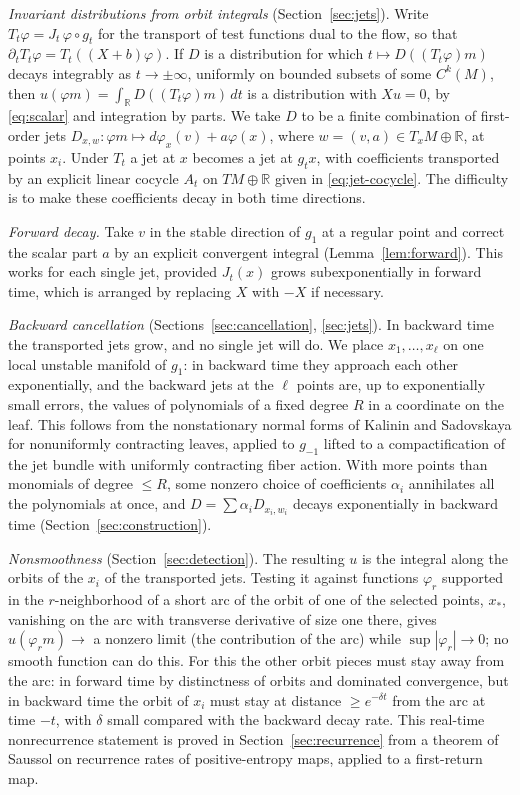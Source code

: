 \documentclass[12pt]{article}
\theoremstyle{remark}
\newcommand{\R}{\mathbb R}
\begin{document}
\emph{Invariant distributions from orbit integrals}
(Section~\ref{sec:jets}).  Write
\(T_t\varphi=J_t\,\varphi\circ g_t\) for the transport of test
functions dual to the flow, so that \(\partial_tT_t\varphi=T_t((X+b)\varphi)\).
If \(D\) is a distribution for which
\(t\mapsto D((T_t\varphi)m)\) decays integrably as \(t\to\pm\infty\),
uniformly on bounded subsets of some \(C^k(M)\), then
\(u(\varphi m)=\int_\R D((T_t\varphi)m)\,dt\) is a distribution with
\(Xu=0\), by \eqref{eq:scalar} and integration by parts.
We take \(D\) to be a finite combination of first-order jets
\(D_{x,w}:\varphi m\mapsto d\varphi_x(v)+a\varphi(x)\), where
\(w=(v,a)\in T_xM\oplus\R\), at points \(x_i\).
Under \(T_t\) a jet at \(x\) becomes a jet at \(g_tx\), with
coefficients transported by an explicit linear cocycle \(A_t\) on
\(TM\oplus\R\) given in \eqref{eq:jet-cocycle}.  The difficulty is
to make these coefficients decay in both time directions.

\emph{Forward decay.}  Take \(v\) in the stable direction of
\(g_1\) at a regular point and correct the scalar part \(a\)
by an explicit convergent integral (Lemma~\ref{lem:forward}).  This
works for each single jet, provided \(J_t(x)\) grows subexponentially
in forward time, which is arranged by replacing \(X\)
with \(-X\) if necessary.

\emph{Backward cancellation} (Sections~\ref{sec:cancellation},
\ref{sec:jets}).  In backward time the transported jets grow, and no
single jet will do.  We place \(x_1,\dots,x_\ell\) on one
local unstable manifold of \(g_1\): in backward time they approach
each other exponentially, and the backward jets at the \(\ell\)
points are, up to exponentially small errors, the values of
polynomials of a fixed degree \(R\) in a coordinate on the
leaf.  This follows from the nonstationary normal forms of
Kalinin and Sadovskaya \cite{KalininSadovskaya2017} for nonuniformly
contracting leaves, applied to \(g_{-1}\) lifted to a
compactification of the jet bundle with uniformly contracting fiber
action.  With more points than monomials of degree
\(\le R\), some nonzero choice of coefficients \(\alpha_i\) annihilates
all the polynomials at once, and \(D=\sum\alpha_iD_{x_i,w_i}\) decays
exponentially in backward time (Section~\ref{sec:construction}).

\emph{Nonsmoothness} (Section~\ref{sec:detection}).  The resulting
\(u\) is the integral along the orbits of the \(x_i\) of the
transported jets.  Testing it against functions \(\varphi_r\)
supported in the \(r\)-neighborhood of a short arc of the orbit of
one of the selected points, \(x_*\), vanishing on the arc with
transverse derivative of size one there, gives \(u(\varphi_rm)\to\)
a nonzero limit (the contribution of the arc) while
\(\sup|\varphi_r|\to0\); no smooth function can do this.  For this
the other orbit pieces must stay away from the arc:
in forward time by distinctness of orbits and dominated convergence,
but in backward time the orbit of \(x_i\) must stay at distance
\(\ge e^{-\delta t}\) from the arc at time \(-t\), with \(\delta\)
small compared with the backward decay rate.  This real-time
nonrecurrence statement is proved in Section~\ref{sec:recurrence}
from a theorem of Saussol \cite{Saussol2004} on recurrence rates of
positive-entropy maps, applied to a first-return map.
\end{document}
